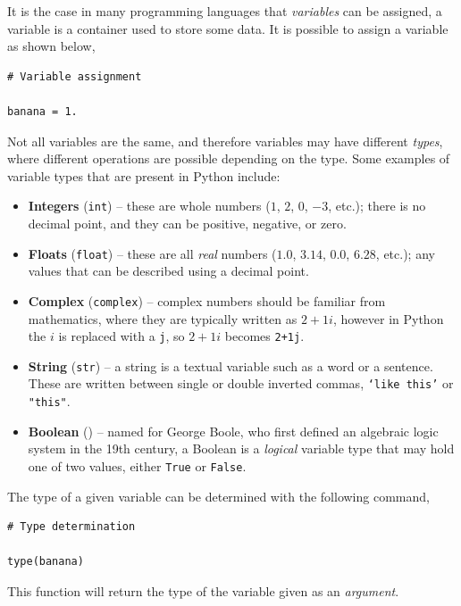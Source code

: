 \documentclass[a4paper]{article}
\begin{document}
It is the case in many programming languages that \emph{variables} can be assigned, a variable is a container used to store some data. 
It is possible to assign a variable as shown below,
\begin{lstlisting}
# Variable assignment

banana = 1.
\end{lstlisting}
Not all variables are the same, and therefore variables may have different \emph{types}, where different operations are possible depending on the type.
Some examples of variable types that are present in Python include: 
\begin{itemize}
	\item{\textbf{Integers} (\texttt{int}) -- these are whole numbers ($1$, $2$, $0$, $-3$, etc.); there is no decimal point, and they can be positive, negative, or zero.}
	\item{\textbf{Floats} (\texttt{float}) -- these are all \emph{real} numbers ($1.0$, $3.14$, $0.0$, $6.28$, etc.); any values that can be described using a decimal point.}
	\item{\textbf{Complex} (\texttt{complex}) -- complex numbers should be familiar from mathematics, where they are typically written as $2+1i$, however in Python the $i$ is replaced with a \texttt{j}, so $2+1i$ becomes \texttt{2+1j}.}
	\item{\textbf{String} (\texttt{str}) -- a string is a textual variable such as a word or a sentence. These are written between single or double inverted commas, \texttt{`like this'} or \texttt{"this"}.}
	\item{\textbf{Boolean} () -- named for George Boole, who first defined an algebraic logic system in the 19th century, a Boolean is a \emph{logical} variable type that may hold one of two values, either \texttt{True} or \texttt{False}.} 
\end{itemize}
The type of a given variable can be determined with the following command, 
\begin{lstlisting}
# Type determination

type(banana)
\end{lstlisting}
This function will return the type of the variable given as an \emph{argument}. 
\end{document}
